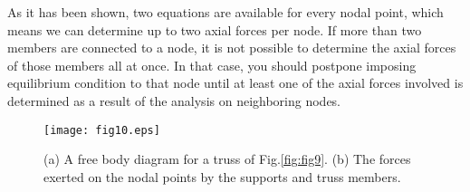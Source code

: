 ﻿\documentclass[10pt,a4j]{article}
\begin{document}
As it has been shown, two equations are available for every nodal point, which 
means we can determine up to two axial forces per node. 
If more than two members are connected to a node, it is not possible to 
determine the axial forces of those members all at once. 
In that case, you should postpone imposing equilibrium condition to that 
node until at least one of the axial forces involved is determined 
as a result of the analysis on neighboring nodes. 
\begin{figure}[h]
	\begin{center}
	\texttt{[image: fig10.eps]} 
	\end{center}
	\caption{(a) A free body diagram for a truss of Fig.\ref{fig:fig9}. 
	(b) The forces exerted on the nodal points by the supports and truss members.} 
	\label{fig:fig10}
\end{figure}
\end{document}
